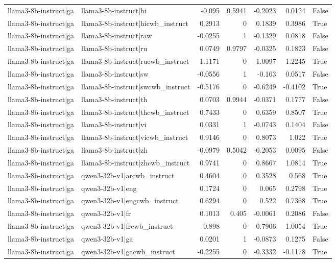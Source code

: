 \begin{table}
\begin{tabular}{l l r r r r l}
llama3-8b-instruct|ga & llama3-8b-instruct|hi & -0.095 & 0.5941 & -0.2023 & 0.0124 & False \\
llama3-8b-instruct|ga & llama3-8b-instruct|hicwb_instruct & 0.2913 & 0 & 0.1839 & 0.3986 & True \\
llama3-8b-instruct|ga & llama3-8b-instruct|raw & -0.0255 & 1 & -0.1329 & 0.0818 & False \\
llama3-8b-instruct|ga & llama3-8b-instruct|ru & 0.0749 & 0.9797 & -0.0325 & 0.1823 & False \\
llama3-8b-instruct|ga & llama3-8b-instruct|rucwb_instruct & 1.1171 & 0 & 1.0097 & 1.2245 & True \\
llama3-8b-instruct|ga & llama3-8b-instruct|sw & -0.0556 & 1 & -0.163 & 0.0517 & False \\
llama3-8b-instruct|ga & llama3-8b-instruct|swcwb_instruct & -0.5176 & 0 & -0.6249 & -0.4102 & True \\
llama3-8b-instruct|ga & llama3-8b-instruct|th & 0.0703 & 0.9944 & -0.0371 & 0.1777 & False \\
llama3-8b-instruct|ga & llama3-8b-instruct|thcwb_instruct & 0.7433 & 0 & 0.6359 & 0.8507 & True \\
llama3-8b-instruct|ga & llama3-8b-instruct|vi & 0.0331 & 1 & -0.0743 & 0.1404 & False \\
llama3-8b-instruct|ga & llama3-8b-instruct|vicwb_instruct & 0.9146 & 0 & 0.8073 & 1.022 & True \\
llama3-8b-instruct|ga & llama3-8b-instruct|zh & -0.0979 & 0.5042 & -0.2053 & 0.0095 & False \\
llama3-8b-instruct|ga & llama3-8b-instruct|zhcwb_instruct & 0.9741 & 0 & 0.8667 & 1.0814 & True \\
llama3-8b-instruct|ga & qwen3-32b-v1|arcwb_instruct & 0.4604 & 0 & 0.3528 & 0.568 & True \\
llama3-8b-instruct|ga & qwen3-32b-v1|eng & 0.1724 & 0 & 0.065 & 0.2798 & True \\
llama3-8b-instruct|ga & qwen3-32b-v1|engcwb_instruct & 0.6294 & 0 & 0.522 & 0.7368 & True \\
llama3-8b-instruct|ga & qwen3-32b-v1|fr & 0.1013 & 0.405 & -0.0061 & 0.2086 & False \\
llama3-8b-instruct|ga & qwen3-32b-v1|frcwb_instruct & 0.898 & 0 & 0.7906 & 1.0054 & True \\
llama3-8b-instruct|ga & qwen3-32b-v1|ga & 0.0201 & 1 & -0.0873 & 0.1275 & False \\
llama3-8b-instruct|ga & qwen3-32b-v1|gacwb_instruct & -0.2255 & 0 & -0.3332 & -0.1178 & True \\

\end{tabular}
\end{table}
